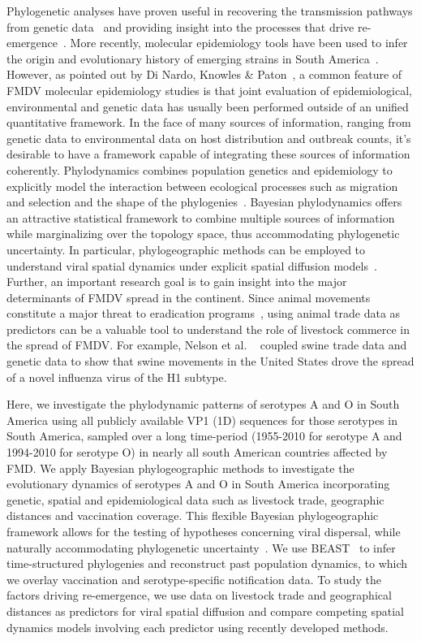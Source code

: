 \documentclass[10pt]{article}
\begin{document}
Phylogenetic analyses have proven useful in recovering the transmission pathways from genetic data~\cite{cottam2007, cottam2008} and providing insight into the processes that drive re-emergence~\cite{combining}.
More recently, molecular epidemiology tools have been used to infer the origin and evolutionary history of emerging strains in South America~\cite{Perez2001, Malirat2007, andean, Malirat2011, Maradei2013}.
However, as pointed out by Di Nardo, Knowles \& Paton~\cite{combining}, a common feature of FMDV molecular epidemiology studies is that  joint evaluation of epidemiological, environmental and genetic data has usually been performed outside of an unified quantitative framework.
In the face of many sources of information, ranging from genetic data to environmental data on host distribution and outbreak counts, it's desirable to have a framework capable of integrating these sources of information coherently.
Phylodynamics combines population genetics and epidemiology to explicitly  model the interaction between ecological processes such as migration and selection and the shape of the phylogenies~\cite{grenfell, vphylodynamics}.
Bayesian phylodynamics offers an attractive statistical framework to combine multiple sources of information while marginalizing over the topology space, thus accommodating phylogenetic uncertainty.
In particular, phylogeographic methods can be employed to understand viral spatial dynamics under explicit spatial diffusion models~\cite{roots}.
Further, an important research goal is to gain insight into the major determinants of FMDV spread in the continent.
Since animal movements constitute a major threat to eradication programs~\cite{movements}, using animal trade data as predictors can be a valuable tool to understand the role of livestock commerce in the spread of FMDV.
For example, Nelson et al. ~\cite{Nelson2011} coupled swine trade data and genetic data to show that swine movements in the United States drove the spread of a novel influenza virus of the H1 subtype.

Here, we investigate the phylodynamic patterns of serotypes A and O in South America using all publicly available VP1 (1D) sequences for those serotypes in South America, sampled over a long time-period (1955-2010 for serotype A and 1994-2010 for serotype O) in nearly all south American countries affected by FMD.
We apply Bayesian phylogeographic methods to investigate the evolutionary dynamics of serotypes A and O in South America incorporating  genetic, spatial and epidemiological data such as livestock trade, geographic distances and vaccination coverage.
This flexible Bayesian phylogeographic framework allows for the testing of hypotheses concerning viral dispersal, while naturally accommodating phylogenetic uncertainty~\cite{roots, towards}.
We use BEAST~\cite{beast2012} to infer time-structured phylogenies and reconstruct past population dynamics, to which we overlay vaccination and serotype-specific notification data.
To study the factors driving re-emergence, we use data on livestock trade and geographical distances as predictors for viral spatial diffusion and compare competing spatial dynamics models involving each predictor using recently developed methods. 
\end{document}
